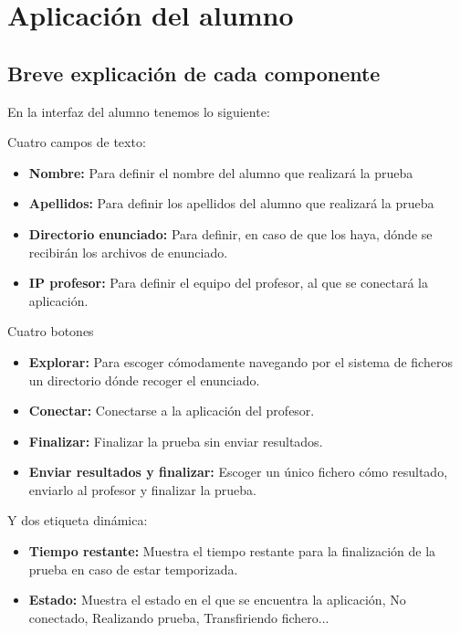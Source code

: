 \documentclass[a4paper,11pt]{article}
\begin{document}
\section{Aplicación del alumno}

\subsection{Breve explicación de cada componente}

En la interfaz del alumno tenemos lo siguiente:

Cuatro campos de texto:

\begin{itemize}

    \item {\bfseries Nombre:} Para definir el nombre del alumno que realizará la prueba
    \item {\bfseries Apellidos:} Para definir los apellidos del alumno que realizará la prueba
    \item {\bfseries Directorio enunciado:} Para definir, en caso de que los haya, dónde se recibirán los archivos de enunciado.
    \item {\bfseries IP profesor:} Para definir el equipo del profesor, al que se conectará la aplicación.

\end{itemize}

Cuatro botones

\begin{itemize}

    \item {\bfseries Explorar:} Para escoger cómodamente navegando por el sistema de ficheros un directorio dónde recoger el enunciado.
    \item {\bfseries Conectar:} Conectarse a la aplicación del profesor.
    \item {\bfseries Finalizar:} Finalizar la prueba sin enviar resultados.
    \item {\bfseries Enviar resultados y finalizar:} Escoger un único fichero cómo resultado, enviarlo al profesor y finalizar la prueba.

\end{itemize}

Y dos etiqueta dinámica:

\begin{itemize}

    \item {\bfseries Tiempo restante:} Muestra el tiempo restante para la finalización de la prueba en caso de estar temporizada.

    \item {\bfseries Estado: } Muestra el estado en el que se encuentra la aplicación, No conectado, Realizando prueba, Transfiriendo fichero...

\end{itemize}
\end{document}

